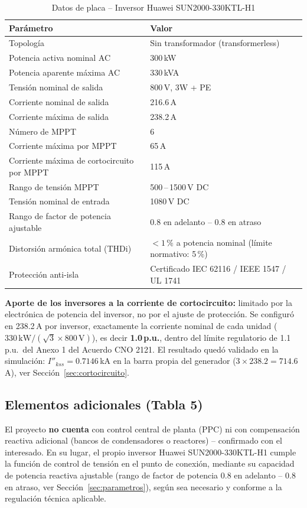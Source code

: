 \documentclass[11pt,a4paper]{article}
\begin{document}
\begin{table}[H]
\centering
\caption{Datos de placa -- Inversor Huawei SUN2000-330KTL-H1}
\begin{tabular}{ll}
\toprule
Par\'ametro & Valor \\
\midrule
Topolog\'ia & Sin transformador (transformerless) \\
Potencia activa nominal AC & 300\,kW \\
Potencia aparente m\'axima AC & 330\,kVA \\
Tensi\'on nominal de salida & 800\,V, 3W + PE \\
Corriente nominal de salida & 216.6\,A \\
Corriente m\'axima de salida & 238.2\,A \\
N\'umero de MPPT & 6 \\
Corriente m\'axima por MPPT & 65\,A \\
Corriente m\'axima de cortocircuito por MPPT & 115\,A \\
Rango de tensi\'on MPPT & 500\,--\,1500\,V DC \\
Tensi\'on nominal de entrada & 1080\,V DC \\
Rango de factor de potencia ajustable & 0.8 en adelanto -- 0.8 en atraso \\
Distorsi\'on arm\'onica total (THDi) & $<1\,\%$ a potencia nominal (l\'imite normativo: 5\,\%) \\
Protecci\'on anti-isla & Certificado IEC 62116 / IEEE 1547 / UL 1741 \\
\bottomrule
\end{tabular}
\end{table}
\textbf{Aporte de los inversores a la corriente de cortocircuito:} limitado por la electr\'onica de potencia del inversor, no por el ajuste de protecci\'on. Se configur\'o en 238.2\,A por inversor, exactamente la corriente nominal de cada unidad ($330\,\text{kW}/(\sqrt{3}\times 800\,\text{V})$), es decir \textbf{1.0\,p.u.}, dentro del l\'imite regulatorio de 1.1\,p.u.\ del Anexo 1 del Acuerdo CNO 2121. El resultado quedó validado en la simulaci\'on: $I''_{kss} = 0.7146$\,kA en la barra propia del generador ($3 \times 238.2 = 714.6$\,A), ver Secci\'on~\ref{sec:cortocircuito}.

\subsection{Elementos adicionales (Tabla 5)}
El proyecto \textbf{no cuenta} con control central de planta (PPC) ni con compensaci\'on reactiva adicional (bancos de condensadores o reactores) -- confirmado con el interesado. En su lugar, el propio inversor Huawei SUN2000-330KTL-H1 cumple la funci\'on de control de tensi\'on en el punto de conexi\'on, mediante su capacidad de potencia reactiva ajustable (rango de factor de potencia 0.8 en adelanto -- 0.8 en atraso, ver Secci\'on~\ref{sec:parametros}), seg\'un sea necesario y conforme a la regulaci\'on t\'ecnica aplicable.
\end{document}
